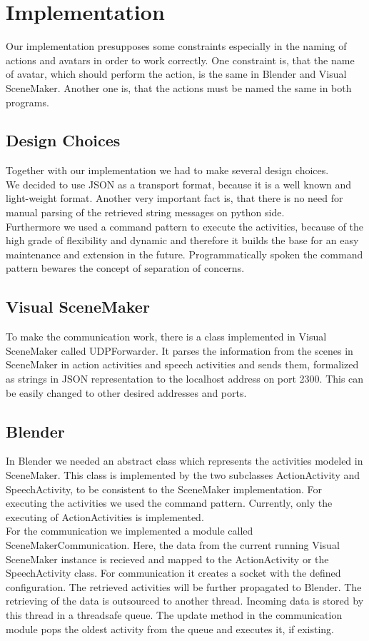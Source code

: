 \documentclass[
10pt, %
a4paper, %
oneside,
headinclude,footinclude, %
BCOR5mm, %
]{scrartcl}
\begin{document}
\section{Implementation}
Our implementation presupposes some constraints especially in the naming of actions and avatars in order to work correctly.
One constraint is, that the name of avatar, which should perform the action, is the same in Blender and Visual SceneMaker. Another one is, that the actions must be named the same in both programs. %

\subsection{Design Choices}
Together with our implementation we had to make several design choices.\\
We decided to use JSON as a transport format, because it is a well known and light-weight format. Another very important fact is, that there is no need for manual parsing of the retrieved string messages on python side.\\
Furthermore we used a command pattern to execute the activities, because of the high grade of flexibility and dynamic and therefore it builds the base for an easy maintenance and extension in the future. Programmatically spoken the command pattern bewares the concept of separation of concerns.

\subsection{Visual SceneMaker}
To make the communication work, there is a class implemented in Visual SceneMaker called UDPForwarder. It parses the information from the scenes in SceneMaker in action activities and speech activities and sends them, formalized as strings in JSON representation to the localhost address on port 2300. This can be easily changed to other desired addresses and ports.

\subsection{Blender}
In Blender we needed an abstract class which represents the activities modeled in SceneMaker. This class is implemented by the two subclasses  ActionActivity and SpeechActivity, to be consistent to the SceneMaker implementation. For executing the activities we used the command pattern. Currently, only the executing of ActionActivities is implemented.\\
For the communication we implemented a module called SceneMakerCommunication. Here, the data from the current running Visual SceneMaker instance is recieved and mapped to the ActionActivity or the SpeechActivity class. For communication it creates a socket with the defined configuration. The retrieved
activities will be further propagated to Blender. The retrieving of the data is outsourced to another thread. Incoming data is stored by this thread in a threadsafe queue. The update method in the communication module pops the oldest activity from the queue and executes it, if existing.
\end{document}
